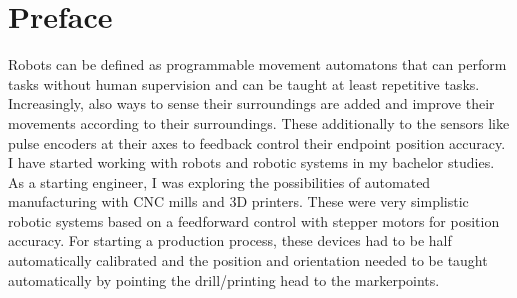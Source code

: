 \chapter{Preface}

Robots can be defined as programmable movement automatons that can perform tasks without human supervision and can be taught at least repetitive tasks. Increasingly, also ways to sense their surroundings are added and improve their movements according to their surroundings. These additionally to the sensors like pulse encoders at their axes to feedback control their endpoint position accuracy. 
\\

I have started working with robots and robotic systems in my bachelor studies. As a starting engineer, I was exploring the possibilities of automated manufacturing with CNC mills and 3D printers. These were very simplistic robotic systems based on a feedforward control with stepper motors for position accuracy. For starting a production process, these devices had to be half automatically calibrated and the position and orientation needed to be taught automatically by pointing the drill/printing head to the markerpoints. 




